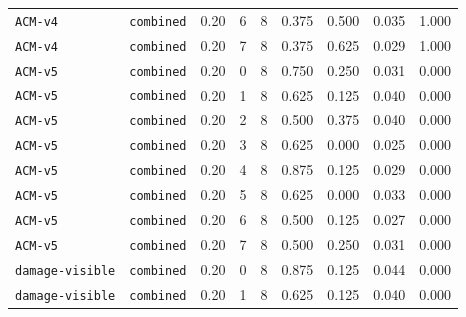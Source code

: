\documentclass{article}
\begin{document}
\begin{center}
\begin{tabular}{llccccccc}
\texttt{ACM-v4} & \texttt{combined} & 0.20 & 6 & 8 & 0.375 & 0.500 & 0.035 & 1.000 \\
\texttt{ACM-v4} & \texttt{combined} & 0.20 & 7 & 8 & 0.375 & 0.625 & 0.029 & 1.000 \\
\texttt{ACM-v5} & \texttt{combined} & 0.20 & 0 & 8 & 0.750 & 0.250 & 0.031 & 0.000 \\
\texttt{ACM-v5} & \texttt{combined} & 0.20 & 1 & 8 & 0.625 & 0.125 & 0.040 & 0.000 \\
\texttt{ACM-v5} & \texttt{combined} & 0.20 & 2 & 8 & 0.500 & 0.375 & 0.040 & 0.000 \\
\texttt{ACM-v5} & \texttt{combined} & 0.20 & 3 & 8 & 0.625 & 0.000 & 0.025 & 0.000 \\
\texttt{ACM-v5} & \texttt{combined} & 0.20 & 4 & 8 & 0.875 & 0.125 & 0.029 & 0.000 \\
\texttt{ACM-v5} & \texttt{combined} & 0.20 & 5 & 8 & 0.625 & 0.000 & 0.033 & 0.000 \\
\texttt{ACM-v5} & \texttt{combined} & 0.20 & 6 & 8 & 0.500 & 0.125 & 0.027 & 0.000 \\
\texttt{ACM-v5} & \texttt{combined} & 0.20 & 7 & 8 & 0.500 & 0.250 & 0.031 & 0.000 \\
\texttt{damage-visible} & \texttt{combined} & 0.20 & 0 & 8 & 0.875 & 0.125 & 0.044 & 0.000 \\
\texttt{damage-visible} & \texttt{combined} & 0.20 & 1 & 8 & 0.625 & 0.125 & 0.040 & 0.000 \\
\bottomrule
\end{tabular}
\end{center}
\end{document}
